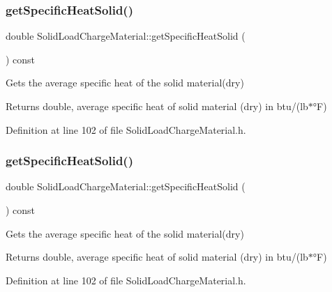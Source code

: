\subsubsection{\texorpdfstring{get\+Specific\+Heat\+Solid()}{getSpecificHeatSolid()}\hspace{0.1cm}{\footnotesize\ttfamily [2/3]}}
{\footnotesize\ttfamily double Solid\+Load\+Charge\+Material\+::get\+Specific\+Heat\+Solid (\begin{DoxyParamCaption}{ }\end{DoxyParamCaption}) const\hspace{0.3cm}{\ttfamily [inline]}}

Gets the average specific heat of the solid material(dry) \begin{DoxyReturn}{Returns}
double, average specific heat of solid material (dry) in btu/(lb$\ast$°F) 
\end{DoxyReturn}


Definition at line 102 of file Solid\+Load\+Charge\+Material.\+h.

\mbox{\label{class_solid_load_charge_material_af84f1f7dd167f67c0c02206339bbfe27}} 
\subsubsection{\texorpdfstring{get\+Specific\+Heat\+Solid()}{getSpecificHeatSolid()}\hspace{0.1cm}{\footnotesize\ttfamily [3/3]}}
{\footnotesize\ttfamily double Solid\+Load\+Charge\+Material\+::get\+Specific\+Heat\+Solid (\begin{DoxyParamCaption}{ }\end{DoxyParamCaption}) const\hspace{0.3cm}{\ttfamily [inline]}}

Gets the average specific heat of the solid material(dry) \begin{DoxyReturn}{Returns}
double, average specific heat of solid material (dry) in btu/(lb$\ast$°F) 
\end{DoxyReturn}


Definition at line 102 of file Solid\+Load\+Charge\+Material.\+h.

\mbox{\label{class_solid_load_charge_material_ade525be6bb8cb86405daeb61d45311f9}} 
